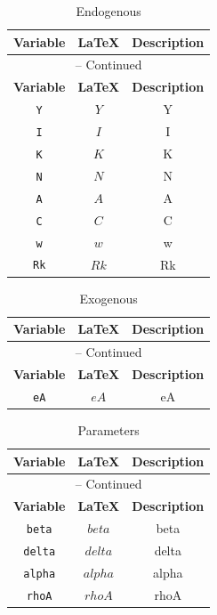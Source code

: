 \begin{center}
\begin{longtable}{ccc}
\caption{Endogenous}\\%
\hline%
\multicolumn{1}{c}{\textbf{Variable}} &
\multicolumn{1}{c}{\textbf{\LaTeX}} &
\multicolumn{1}{c}{\textbf{Description}}\\%
\hline\hline%
\endfirsthead
\multicolumn{3}{c}{{\tablename} \thetable{} -- Continued}\\%
\hline%
\multicolumn{1}{c}{\textbf{Variable}} &
\multicolumn{1}{c}{\textbf{\LaTeX}} &
\multicolumn{1}{c}{\textbf{Description}}\\%
\hline\hline%
\endhead
\texttt{Y} & $Y$ & Y\\
\texttt{I} & $I$ & I\\
\texttt{K} & $K$ & K\\
\texttt{N} & $N$ & N\\
\texttt{A} & $A$ & A\\
\texttt{C} & $C$ & C\\
\texttt{w} & $w$ & w\\
\texttt{Rk} & $Rk$ & Rk\\
\hline%
\end{longtable}
\end{center}
\begin{center}
\begin{longtable}{ccc}
\caption{Exogenous}\\%
\hline%
\multicolumn{1}{c}{\textbf{Variable}} &
\multicolumn{1}{c}{\textbf{\LaTeX}} &
\multicolumn{1}{c}{\textbf{Description}}\\%
\hline\hline%
\endfirsthead
\multicolumn{3}{c}{{\tablename} \thetable{} -- Continued}\\%
\hline%
\multicolumn{1}{c}{\textbf{Variable}} &
\multicolumn{1}{c}{\textbf{\LaTeX}} &
\multicolumn{1}{c}{\textbf{Description}}\\%
\hline\hline%
\endhead
\texttt{eA} & $eA$ & eA\\
\hline%
\end{longtable}
\end{center}
\begin{center}
\begin{longtable}{ccc}
\caption{Parameters}\\%
\hline%
\multicolumn{1}{c}{\textbf{Variable}} &
\multicolumn{1}{c}{\textbf{\LaTeX}} &
\multicolumn{1}{c}{\textbf{Description}}\\%
\hline\hline%
\endfirsthead
\multicolumn{3}{c}{{\tablename} \thetable{} -- Continued}\\%
\hline%
\multicolumn{1}{c}{\textbf{Variable}} &
\multicolumn{1}{c}{\textbf{\LaTeX}} &
\multicolumn{1}{c}{\textbf{Description}}\\%
\hline\hline%
\endhead
\texttt{beta} & $beta$ & beta\\
\texttt{delta} & $delta$ & delta\\
\texttt{alpha} & $alpha$ & alpha\\
\texttt{rhoA} & $rhoA$ & rhoA\\
\hline%
\end{longtable}
\end{center}
